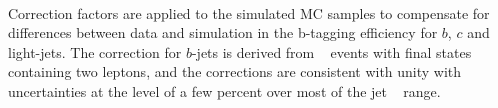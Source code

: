 

\paragraph{}
Correction factors are applied to the simulated MC samples to compensate for differences between data and simulation in the b-tagging efficiency for $b$, $c$ and light-jets. The correction for $b$-jets is derived from \ttbar~ events with final states containing two leptons, and the corrections are consistent with unity with uncertainties at the level of a few percent over most of the jet \pt~ range.



